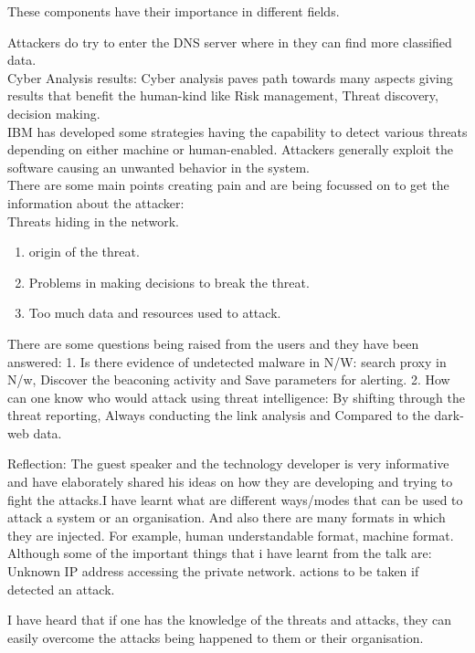\documentclass[a4paper, 11pt]{article}
\begin{document}
	These components have their importance in different fields. 

	Attackers do try to enter the DNS server where in they can find more classified data.
\\

Cyber Analysis results:
    Cyber analysis paves path towards many aspects giving results that benefit the human-kind like Risk management, Threat discovery, decision making. 
	\\
	IBM has developed some strategies having the capability to detect various threats depending on either machine or human-enabled. Attackers generally exploit the software causing an unwanted behavior in the system. 
\\
	There are some main points creating pain and are being focussed on to get the information about the attacker:
\\
Threats hiding in the network.
\begin{enumerate}
\item origin of the threat.
\item Problems in making decisions to break the threat.
\item Too much data and resources used to attack.

\end{enumerate}


	There are some questions being raised from the users and they have been answered:
	1. Is there evidence of undetected malware in N/W:
search proxy in N/w,
Discover the beaconing activity and
Save parameters for alerting.
	2. How can one know who would attack using threat intelligence:
By shifting through the threat reporting,
Always conducting the link analysis and
Compared to the dark-web data. 




Reflection:
	The guest speaker and the technology developer is very informative and have elaborately shared his ideas on how they are developing and trying to fight the attacks.I have learnt what are different ways/modes that can be used to attack a system or an organisation. And also there are many formats in which they are injected. For example, human understandable format, machine format.
	Although some of the important things that i have learnt from the talk are:
Unknown IP address accessing the private network.
actions to be taken if detected an attack.

	I have heard that if one has the knowledge of the threats and attacks, they can easily overcome the attacks being happened to them or their organisation.
\end{document}
